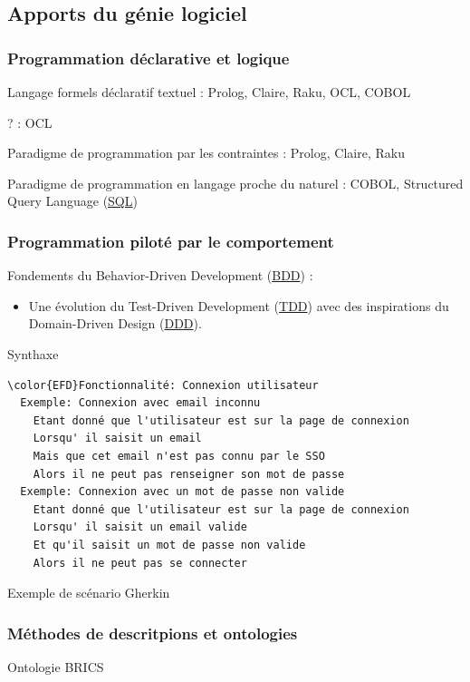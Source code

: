 \documentclass[a4paper,12pt]{article}
\begin{document}
\subsection{Apports du génie logiciel}
\label{sec:orgc58a2a7}
\subsubsection{Programmation déclarative et logique}
\label{sec:orgcc89692}
Langage formels déclaratif textuel : Prolog, Claire, Raku, OCL, COBOL

? : OCL

Paradigme de programmation par les contraintes : Prolog, Claire, Raku

Paradigme de programmation en langage proche du naturel : COBOL, Structured Query Language
 (\protect\hyperlink{gls-2}{\label{gls-2-use-1}SQL})
\subsubsection{Programmation piloté par le comportement}
\label{sec:orgccd30d9}
Fondements du Behavior-Driven Development
 (\protect\hyperlink{gls-3}{\label{gls-3-use-1}BDD}) :
\begin{itemize}
\item Une évolution du Test-Driven Development
 (\protect\hyperlink{gls-4}{\label{gls-4-use-1}TDD}) avec des inspirations du Domain-Driven Design
 (\protect\hyperlink{gls-5}{\label{gls-5-use-1}DDD}).
\end{itemize}

Synthaxe

\begin{listing}[htbp]
\begin{Code}
\begin{Verbatim}
\color{EFD}Fonctionnalité: Connexion utilisateur
  Exemple: Connexion avec email inconnu
    Etant donné que l'utilisateur est sur la page de connexion
    Lorsqu' il saisit un email
    Mais que cet email n'est pas connu par le SSO
    Alors il ne peut pas renseigner son mot de passe
  Exemple: Connexion avec un mot de passe non valide
    Etant donné que l'utilisateur est sur la page de connexion
    Lorsqu' il saisit un email valide
    Et qu'il saisit un mot de passe non valide
    Alors il ne peut pas se connecter
\end{Verbatim}
\end{Code}
\caption{\label{lst:org5e92ca9}Exemple de scénario Gherkin}
\end{listing}
\subsubsection{Méthodes de descritpions et ontologies}
\label{sec:org6e87e6f}
Ontologie BRICS
\end{document}
